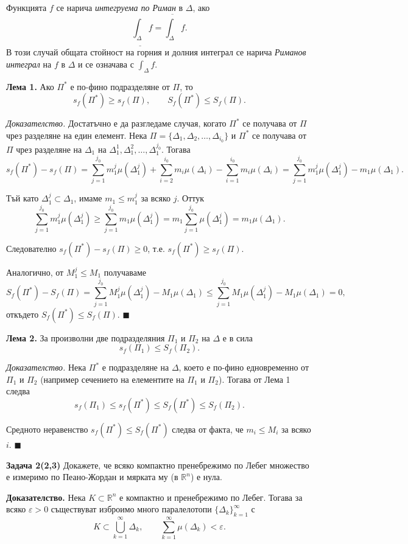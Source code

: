 \documentclass[10pt]{article}
\begin{document}
Функцията $f$ се нарича \textit{интегруема по Риман} в $\Delta$, ако
\[
\underline{\int_{\Delta}} f = \overline{\int_{\Delta}} f.
\]
В този случай общата стойност на горния и долния интеграл се нарича \textit{Риманов интеграл} на $f$ в $\Delta$ и се означава с $\displaystyle \int_{\Delta} f$.

\textbf{Лема 1.} 
Ако $\Pi^*$ е по-фино подразделяне от $\Pi$, то
\[
s_f(\Pi^*) \ge s_f(\Pi), \qquad S_f(\Pi^*) \le S_f(\Pi).
\]

\textit{Доказателство.} 
Достатъчно е да разгледаме случая, когато $\Pi^*$ се получава от $\Pi$ чрез разделяне на един елемент. 
Нека $\Pi = \{\Delta_1, \Delta_2, \dots, \Delta_{i_0}\}$ и $\Pi^*$ се получава от $\Pi$ чрез разделяне на $\Delta_1$ на $\Delta_1^1, \Delta_1^2, \dots, \Delta_1^{j_0}$. 
Тогава
\[
s_f(\Pi^*) - s_f(\Pi) = \sum_{j=1}^{j_0} m_1^j \mu(\Delta_1^j) + \sum_{i=2}^{i_0} m_i \mu(\Delta_i) - \sum_{i=1}^{i_0} m_i \mu(\Delta_i) = \sum_{j=1}^{j_0} m_1^j \mu(\Delta_1^j) - m_1 \mu(\Delta_1).
\]

Тъй като $\Delta_1^j \subset \Delta_1$, имаме $m_1 \le m_1^j$ за всяко $j$. Оттук
\[
\sum_{j=1}^{j_0} m_1^j \mu(\Delta_1^j) \ge \sum_{j=1}^{j_0} m_1 \mu(\Delta_1^j) = m_1 \sum_{j=1}^{j_0} \mu(\Delta_1^j) = m_1 \mu(\Delta_1).
\]

Следователно $s_f(\Pi^*) - s_f(\Pi) \ge 0$, т.е. $s_f(\Pi^*) \ge s_f(\Pi)$.

Аналогично, от $M_1^j \le M_1$ получаваме
\[
S_f(\Pi^*) - S_f(\Pi) = \sum_{j=1}^{j_0} M_1^j \mu(\Delta_1^j) - M_1 \mu(\Delta_1) \le \sum_{j=1}^{j_0} M_1 \mu(\Delta_1^j) - M_1 \mu(\Delta_1) = 0,
\]
откъдето $S_f(\Pi^*) \le S_f(\Pi)$. $\blacksquare$

\textbf{Лема 2.} 
За произволни две подразделяния $\Pi_1$ и $\Pi_2$ на $\Delta$ е в сила
\[
s_f(\Pi_1) \le S_f(\Pi_2).
\]

\textit{Доказателство.} 
Нека $\Pi^*$ е подразделяне на $\Delta$, което е по-фино едновременно от $\Pi_1$ и $\Pi_2$ (например сечението на елементите на $\Pi_1$ и $\Pi_2$). 
Тогава от Лема 1 следва
\[
s_f(\Pi_1) \le s_f(\Pi^*) \le S_f(\Pi^*) \le S_f(\Pi_2).
\]

Средното неравенство $s_f(\Pi^*) \le S_f(\Pi^*)$ следва от факта, че $m_i \le M_i$ за всяко $i$. $\blacksquare$



\textbf{Задача 2(2,3) }Докажете, че всяко компактно пренебрежимо по Лебег множество е измеримо по Пеано-Жордан и мярката му (в $\mathbb{R}^n$) е нула. 

\textbf{Доказателство.} 
Нека $K \subset \mathbb{R}^n$ е компактно и пренебрежимо по Лебег. Тогава за всяко $\varepsilon > 0$ съществуват изброимо много паралелотопи $\{\Delta_k\}_{k=1}^\infty$ с
\[
K \subset \bigcup_{k=1}^\infty \Delta_k, \qquad \sum_{k=1}^\infty \mu(\Delta_k) < \varepsilon.
\]
\end{document}
